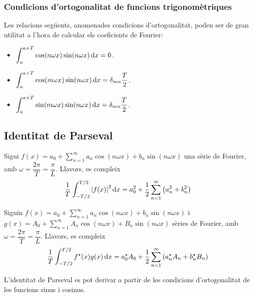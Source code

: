 \subsubsection*{Condicions d'ortogonalitat de funcions trigonomètriques}
Les relacions següents, anomenades condicions d'ortogonalitat, poden ser de gran utilitat a l'hora de calcular els coeficients de Fourier:
\begin{itemize}
    \item $\displaystyle \int_{a}^{a+T} \cos (n\omega x) \sin (n\omega x) \mathop{}\!\mathrm{d} x = 0$.
    \item $\displaystyle \int_{a}^{a+T} \cos (m\omega x) \sin (n\omega x) \mathop{}\!\mathrm{d} x = \delta_{mn} \dfrac{T}{2}$.
    \item $\displaystyle \int_{a}^{a+T} \sin (m\omega x) \sin (n\omega x) \mathop{}\!\mathrm{d} x = \delta_{mn} \dfrac{T}{2}$.
\end{itemize}

\subsection{Identitat de Parseval}
\begin{thm}[de Parseval]
    Sigui $f(x) = \displaystyle a_{0} + \sum_{n=1}^{\infty} a_{n} \cos (n\omega x) + b_{n} \sin (n \omega x)$ una sèrie de Fourier, amb $\omega = \dfrac{2\pi}{T} = \dfrac{\pi}{L}$. Llavors, es compleix
    \begin{align}
        \frac{1}{T} \int_{-T/2}^{T/2} \left| f(x) \right|^{2} \mathop{}\!\mathrm{d} x = a_{0}^{2} + \frac{1}{2}\sum_{n=1}^{\infty} \left( a_{n}^{2} + b_{n}^{2} \right)
    \end{align}
\end{thm}

\begin{thm}
    Siguin $f(x) = \displaystyle a_{0} + \sum_{n=1}^{\infty} a_{n} \cos (n\omega x) + b_{n} \sin (n \omega x)$ i $g(x) = \displaystyle A_{0} + \sum_{n=1}^{\infty} A_{n} \cos (n\omega x) + B_{n} \sin (n \omega x)$ sèries de Fourier, amb $\omega = \dfrac{2\pi}{T} = \dfrac{\pi}{L}$. Llavors, es compleix
    \begin{align}
        \frac{1}{T} \int_{-T/2}^{T/2} f^{\star}(x) g(x) \mathop{}\!\mathrm{d} x = a_{0}^{\star} A_{0} + \frac{1}{2} \sum_{n=1}^{\infty} \left( a_{n}^{\star} A_{n} + b_{n}^{\star} B_{n} \right)
    \end{align}
\end{thm}

\begin{sproof}
    L'identitat de Parseval es pot derivar a partir de les condicions d'ortogonalitat de les funcions sinus i cosinus.
\end{sproof}

